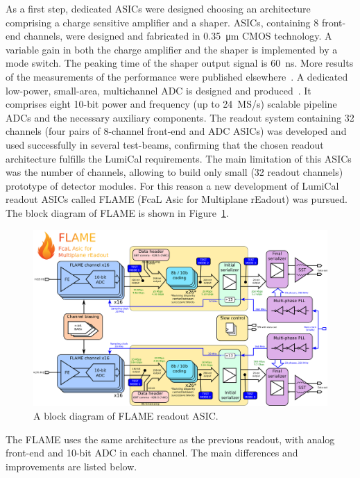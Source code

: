 As a first step, dedicated ASICs were designed choosing
an
architecture~\cite{Boie1982365,Gatti:1986qq}
comprising a charge sensitive amplifier and a shaper.
ASICs, containing 8 front-end channels, were designed and fabricated in \SI{0.35}{\micro\meter} CMOS technology.
A variable gain in both the charge amplifier and
the shaper is implemented by a mode switch. The peaking time of the shaper output signal is \SI{60}{ns}.
More results of the measurements of the performance were published elsewhere~\cite{4600902}.
A dedicated low-power, small-area, multichannel ADC is designed and produced~\cite{6156491}.
It comprises eight 10-bit power and frequency (up to \SI{24}{MS/s}) scalable pipeline ADCs and the necessary
auxiliary components.
The readout system containing 32 channels (four pairs of 8-channel front-end and ADC ASICs) was developed and used
successfully in several test-beams, confirming that the chosen readout architecture fulfills the LumiCal requirements.
The main limitation of this ASICs was the number of channels, allowing to build only
small (32 readout channels)  prototype of detector modules. For this reason a new
development of LumiCal readout ASICs called FLAME (FcaL Asic for Multiplane rEadout)
was pursued. The block diagram of FLAME is shown in Figure~\ref{fig:FLAME}. 
\begin{figure}
\centering
    \includegraphics[width=0.9\columnwidth]{Calorimeter/FCAL/figs/FLAME}
    \caption{A block diagram of FLAME readout ASIC.}
    \label{fig:FLAME}
\end{figure}
The FLAME uses the same architecture as the previous readout, with analog front-end and 10-bit ADC in each channel.
The main differences and improvements are listed below. 
